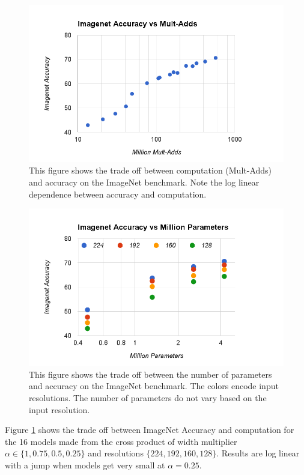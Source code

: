 \documentclass[10pt,twocolumn,letterpaper]{article}
\begin{document}
\begin{figure}
  \includegraphics[width=\linewidth]{mobilenet_multadds_cr.png}
  \caption{This figure shows the trade off between computation (Mult-Adds) and accuracy on the ImageNet benchmark. Note the log linear dependence between accuracy and computation.}
  \label{fig:mult-add}
\end{figure}

\begin{figure}
  \includegraphics[width=\linewidth]{mobilenet_log_parameters_cr.png}
  \caption{This figure shows the trade off between the number of parameters and accuracy on the ImageNet benchmark. The colors encode input resolutions. The number of parameters do not vary based on the input resolution. }
  \label{fig:parameters}
\end{figure}

Figure \ref{fig:mult-add} shows the trade off between ImageNet Accuracy and computation for the 16 models made from the cross product of width multiplier $\alpha \in \{1,0.75,0.5,0.25\}$ and resolutions $\{224, 192, 160, 128\}$. Results are log linear with a jump when models get very small at $\alpha=0.25$.
\end{document}
